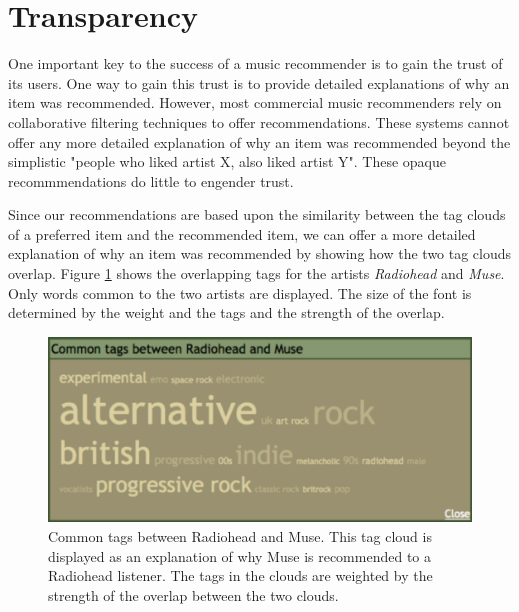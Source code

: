 \documentclass[letterpaper,10pt,twocolumn]{article}
\begin{document}
\section{Transparency}
One important key to the success  of a music recommender is to gain the
trust of its users\cite{trust}.  One way to gain this trust is to provide
detailed explanations of why an item was recommended.  However,
most commercial music recommenders rely on collaborative filtering
techniques to offer recommendations.  These systems cannot offer
any more detailed explanation of why an item was recommended beyond
the simplistic "people who liked artist X, also liked artist Y".
These opaque recommmendations do little to engender trust.

Since our recommendations are based upon the similarity between  the tag clouds
of a preferred item and the recommended item, we can
offer a more detailed explanation of why an item was recommended
by showing how the two tag clouds overlap. Figure \ref{fig:commontags} shows
the overlapping tags for the artists \textit{Radiohead} and \textit{Muse}.
Only words common to the two artists are displayed. The size of the
font is determined by the weight and the tags and the strength of the
overlap.

\begin{figure}[ht]
\begin{center}
\includegraphics[width=0.9\columnwidth]{radiohead-muse-commontags}
\end{center}
\caption{Common tags between Radiohead and Muse. This tag cloud is displayed as an 
explanation of why Muse is recommended to a Radiohead listener. The tags in the 
clouds are weighted by the strength of the overlap between the two clouds.}
\label{fig:commontags}
\end{figure}

\label{section:steerable}
\end{document}
